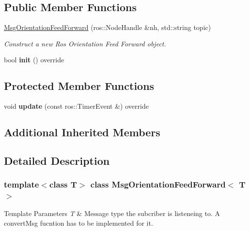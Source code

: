 \subsection*{Public Member Functions}
\begin{DoxyCompactItemize}
\item 
\hyperlink{classMsgOrientationFeedForward_a487a69133c5098f14abeeeefe76306d1}{Msg\+Orientation\+Feed\+Forward} (ros\+::\+Node\+Handle \&nh, std\+::string topic)
\begin{DoxyCompactList}\small\item\em Construct a new Ros Orientation Feed Forward object. \end{DoxyCompactList}\item 
\mbox{\label{classMsgOrientationFeedForward_ae8216c873380686eb462826e3c48cf8e}} 
bool {\bfseries init} () override
\end{DoxyCompactItemize}
\subsection*{Protected Member Functions}
\begin{DoxyCompactItemize}
\item 
\mbox{\label{classMsgOrientationFeedForward_a78a74196a620861ae943af2d6d50c8af}} 
void {\bfseries update} (const ros\+::\+Timer\+Event \&) override
\end{DoxyCompactItemize}
\subsection*{Additional Inherited Members}


\subsection{Detailed Description}
\subsubsection*{template$<$class T$>$\newline
class Msg\+Orientation\+Feed\+Forward$<$ T $>$}


\begin{DoxyTemplParams}{Template Parameters}
{\em T} & Message type the subcriber is listeneing to. A convert\+Msg fucntion has to be implemented for it. \\
\hline
\end{DoxyTemplParams}


